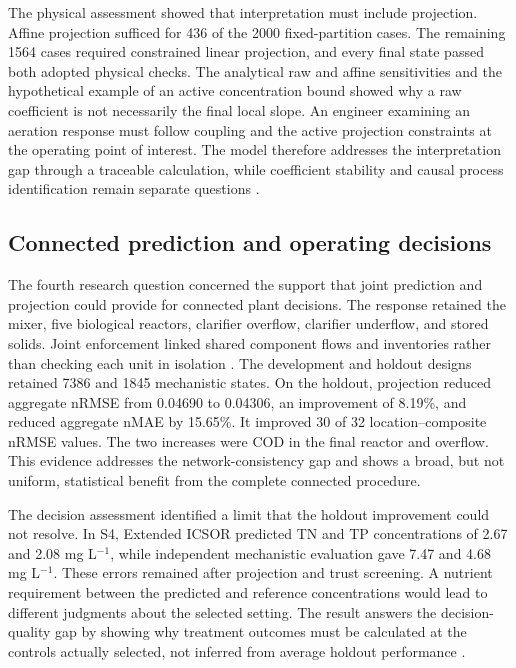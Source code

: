 The physical assessment showed that interpretation must include projection. Affine projection sufficed for 436 of the 2000 fixed-partition cases. The remaining 1564 cases required constrained linear projection, and every final state passed both adopted physical checks. The analytical raw and affine sensitivities and the hypothetical example of an active concentration bound showed why a raw coefficient is not necessarily the final local slope. An engineer examining an aeration response must follow coupling and the active projection constraints at the operating point of interest. The model therefore addresses the interpretation gap through a traceable calculation, while coefficient stability and causal process identification remain separate questions \citep{Selerio2026,Shen2023}.

\subsection{Connected prediction and operating decisions}

The fourth research question concerned the support that joint prediction and projection could provide for connected plant decisions. The response retained the mixer, five biological reactors, clarifier overflow, clarifier underflow, and stored solids. Joint enforcement linked shared component flows and inventories rather than checking each unit in isolation \citep{Alex2008,JeppssonDiehl1996}. The development and holdout designs retained 7386 and 1845 mechanistic states. On the holdout, projection reduced aggregate nRMSE from 0.04690 to 0.04306, an improvement of 8.19\%, and reduced aggregate nMAE by 15.65\%. It improved 30 of 32 location--composite nRMSE values. The two increases were COD in the final reactor and overflow. This evidence addresses the network-consistency gap and shows a broad, but not uniform, statistical benefit from the complete connected procedure.

The decision assessment identified a limit that the holdout improvement could not resolve. In S4, Extended ICSOR predicted TN and TP concentrations of 2.67 and 2.08 mg L$^{-1}$, while independent mechanistic evaluation gave 7.47 and 4.68 mg L$^{-1}$. These errors remained after projection and trust screening. A nutrient requirement between the predicted and reference concentrations would lead to different judgments about the selected setting. The result answers the decision-quality gap by showing why treatment outcomes must be calculated at the controls actually selected, not inferred from average holdout performance \citep{Alexandrov1998,Pedrozo2025}.


